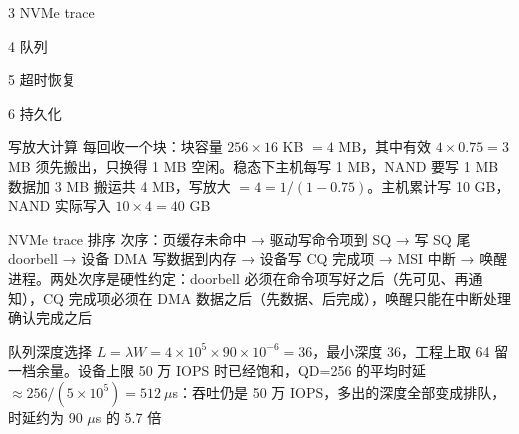 \begin{chapteranswer}{3}
NVMe trace
\end{chapteranswer}

\begin{chapteranswer}{4}
队列
\end{chapteranswer}

\begin{chapteranswer}{5}
超时恢复
\end{chapteranswer}

\begin{chapteranswer}{6}
持久化
\end{chapteranswer}

\begin{chapteranswer}{写放大计算}
每回收一个块：块容量 $256\times16$ KB $=4$ MB，其中有效 $4\times0.75=3$ MB 须先搬出，只换得 1 MB 空闲。稳态下主机每写 1 MB，NAND 要写 1 MB 数据加 3 MB 搬运共 4 MB，写放大 $=4=1/(1-0.75)$。主机累计写 10 GB，NAND 实际写入 $10\times4=40$ GB
\end{chapteranswer}

\begin{chapteranswer}{NVMe trace 排序}
次序：页缓存未命中 → 驱动写命令项到 SQ → 写 SQ 尾 doorbell → 设备 DMA 写数据到内存 → 设备写 CQ 完成项 → MSI 中断 → 唤醒进程。两处次序是硬性约定：doorbell 必须在命令项写好之后（先可见、再通知），CQ 完成项必须在 DMA 数据之后（先数据、后完成），唤醒只能在中断处理确认完成之后
\end{chapteranswer}

\begin{chapteranswer}{队列深度选择}
$L=\lambda W=4\times10^{5}\times90\times10^{-6}=36$，最小深度 36，工程上取 64 留一档余量。设备上限 50 万 IOPS 时已经饱和，QD=256 的平均时延 $\approx256/(5\times10^{5})=512\ \mu$s：吞吐仍是 50 万 IOPS，多出的深度全部变成排队，时延约为 90 $\mu$s 的 5.7 倍
\end{chapteranswer}
